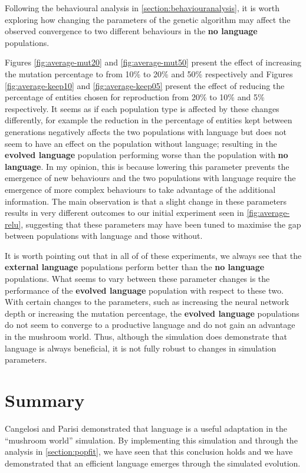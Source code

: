 \documentclass[12pt,a4paper]{report}
\begin{document}
Following the behavioural analysis in \cref{section:behaviouranalysis}, it is worth exploring how changing the parameters of the genetic algorithm may affect the observed convergence to two different behaviours in the {\bf no language} populations.

Figures \ref{fig:average-mut20} and \ref{fig:average-mut50} present the effect of increasing the mutation percentage to from 10\% to 20\% and 50\% respectively and Figures \ref{fig:average-keep10} and \ref{fig:average-keep05} present the effect of reducing the percentage of entities chosen for reproduction from 20\% to 10\% and 5\% respectively. It seems as if each population type is affected by these changes differently, for example the reduction in the percentage of entities kept between generations negatively affects the two populations with language but does not seem to have an effect on the population without language; resulting in the {\bf evolved language} population performing worse than the population with {\bf no language}. In my opinion, this is because lowering this parameter prevents the emergence of new behaviours and the two populations with language require the emergence of more complex behaviours to take advantage of the additional information. The main observation is that a slight change in these parameters results in very different outcomes to our initial experiment seen in \cref{fig:average-relu}, suggesting that these parameters may have been tuned to maximise the gap between populations with language and those without.

It is worth pointing out that in all of of these experiments, we always see that the {\bf external language} populations perform better than the {\bf no language} populations. What seems to vary between these parameter changes is the performance of the {\bf evolved language} population with respect to these two. With certain changes to the parameters, such as increasing the neural network depth or increasing the mutation percentage, the {\bf evolved language} populations do not seem to converge to a productive language and do not gain an advantage in the mushroom world. Thus, although the simulation does demonstrate that language is always beneficial, it is not fully robust to changes in simulation parameters.

 \section{Summary}
 
Cangelosi and Parisi demonstrated that language is a useful adaptation in the ``mushroom world'' simulation. By implementing this simulation and through the analysis in \cref{section:popfit}, we have seen that this conclusion holds and we have demonstrated that an efficient language emerges through the simulated evolution.
\end{document}

